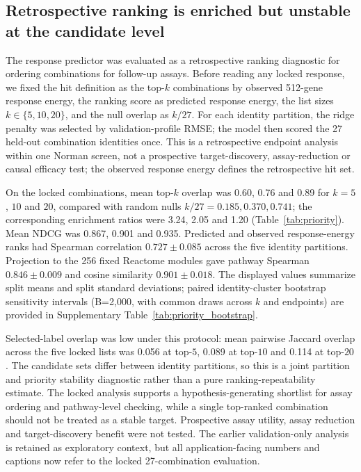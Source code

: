 \documentclass[10pt]{article}
\begin{document}
\subsection{Retrospective ranking is enriched but unstable at the candidate level}
The response predictor was evaluated as a retrospective ranking diagnostic for ordering combinations for follow-up assays. Before reading any locked response, we fixed the hit definition as the top-$k$ combinations by observed 512-gene response energy, the ranking score as predicted response energy, the list sizes $k\in\{5,10,20\}$, and the null overlap as $k/27$. For each identity partition, the ridge penalty was selected by validation-profile RMSE; the model then scored the 27 held-out combination identities once. This is a retrospective endpoint analysis within one Norman screen, not a prospective target-discovery, assay-reduction or causal efficacy test; the observed response energy defines the retrospective hit set.

On the locked combinations, mean top-$k$ overlap was 0.60, 0.76 and 0.89 for $k=5$, $10$ and $20$, compared with random nulls $k/27=0.185,0.370,0.741$; the corresponding enrichment ratios were 3.24, 2.05 and 1.20 (Table~\ref{tab:priority}). Mean NDCG was 0.867, 0.901 and 0.935. Predicted and observed response-energy ranks had Spearman correlation $0.727\pm0.085$ across the five identity partitions. Projection to the 256 fixed Reactome modules gave pathway Spearman $0.846\pm0.009$ and cosine similarity $0.901\pm0.018$. The displayed values summarize split means and split standard deviations; paired identity-cluster bootstrap sensitivity intervals (B=2,000, with common draws across $k$ and endpoints) are provided in Supplementary Table~\ref{tab:priority_bootstrap}.

Selected-label overlap was low under this protocol: mean pairwise Jaccard overlap across the five locked lists was 0.056 at top-$5$, 0.089 at top-$10$ and 0.114 at top-$20$. The candidate sets differ between identity partitions, so this is a joint partition and priority stability diagnostic rather than a pure ranking-repeatability estimate. The locked analysis supports a hypothesis-generating shortlist for assay ordering and pathway-level checking, while a single top-ranked combination should not be treated as a stable target. Prospective assay utility, assay reduction and target-discovery benefit were not tested. The earlier validation-only analysis is retained as exploratory context, but all application-facing numbers and captions now refer to the locked 27-combination evaluation.
\end{document}

